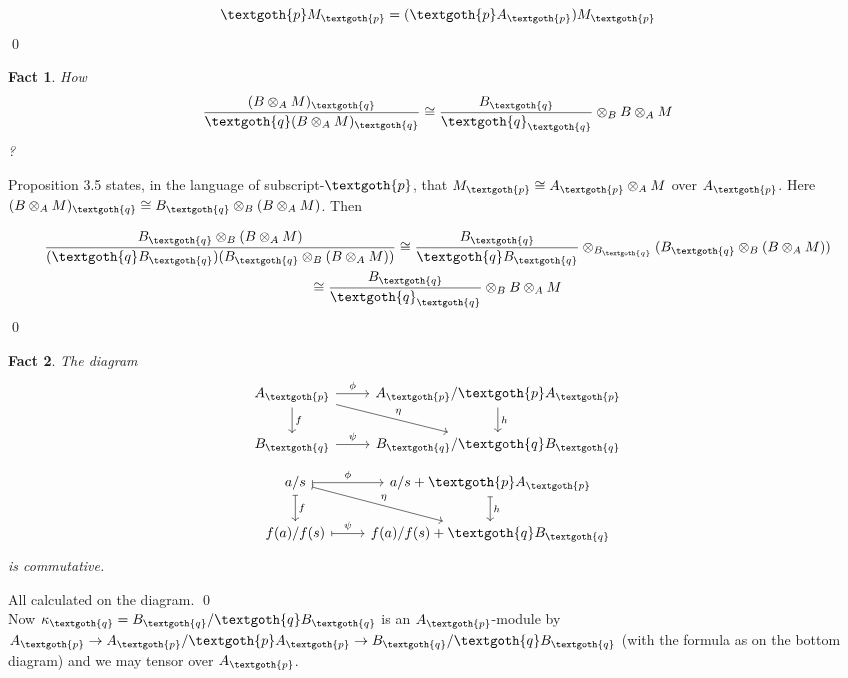 \documentclass{article}
\newtheorem{theorem}{Fact}[section]
\begin{document}
\[
  \textgoth{p} M_\textgoth{p} = (\textgoth{p} A_\textgoth{p}) M_\textgoth{p}
\]
\qed

\begin{theorem}
How
\[
\frac{(B \otimes_A M)_\textgoth{q}}{\textgoth{q} (B \otimes_A M)_\textgoth{q}} 
\cong
\frac{B_\textgoth{q}}{\textgoth{q}_\textgoth{q}} \otimes_B B \otimes_A M
\]
?
\end{theorem}

\noindent
Proposition 3.5 states, in the language of subscript-$\textgoth{p}$, that $M_\textgoth{p} \cong A_\textgoth{p} \otimes_A M$ over $A_\textgoth{p}$. Here $(B \otimes_A M)_\textgoth{q} \cong B_\textgoth{q} \otimes_B (B \otimes_A M)$. Then

\begin{gather*}
\frac{B_\textgoth{q} \otimes_B (B \otimes_A M)}{(\textgoth{q} B_\textgoth{q})(B_\textgoth{q} \otimes_B (B \otimes_A M))}
\cong
\frac{B_\textgoth{q}}{\textgoth{q} B_\textgoth{q}} \otimes_{B_\textgoth{q}} (B_\textgoth{q} \otimes_B (B \otimes_A M)) \\
\cong
\frac{B_\textgoth{q}}{\textgoth{q}_\textgoth{q}} \otimes_B B \otimes_A M
\end{gather*}
\qed

\begin{theorem}
The diagram
\[
     \begin{tikzcd}
     A_\textgoth{p} \arrow{r}{\phi} \arrow{d}{f} \arrow{dr}{\eta} & A_\textgoth{p}/\textgoth{p}A_\textgoth{p} \arrow{d}{h} \\
     B_\textgoth{q} \arrow{r}{\psi} & B_\textgoth{q}/\textgoth{q}B_\textgoth{q}
     \end{tikzcd}
\]
\[
     \begin{tikzcd}
     a/s \arrow[r, mapsto, "\phi"] \arrow[d, mapsto, "f"] \arrow[dr, mapsto, "\eta"] & a/s + \textgoth{p}A_\textgoth{p} \arrow[d, mapsto, "h"] \\
     f(a)/f(s) \arrow[r, mapsto, "\psi"] & f(a)/f(s) + \textgoth{q}B_\textgoth{q}
     \end{tikzcd}
\]
is commutative.
\end{theorem}

\noindent
All calculated on the diagram.
\qed
\\

Now $\kappa_\textgoth{q} = B_\textgoth{q}/\textgoth{q}B_\textgoth{q}$ is an $A_\textgoth{p}$-module by $A_\textgoth{p} \rightarrow A_\textgoth{p}/\textgoth{p}A_\textgoth{p} \rightarrow B_\textgoth{q}/\textgoth{q}B_\textgoth{q}$ (with the formula as on the bottom diagram) and we may tensor over $A_\textgoth{p}$. 
\end{document}
